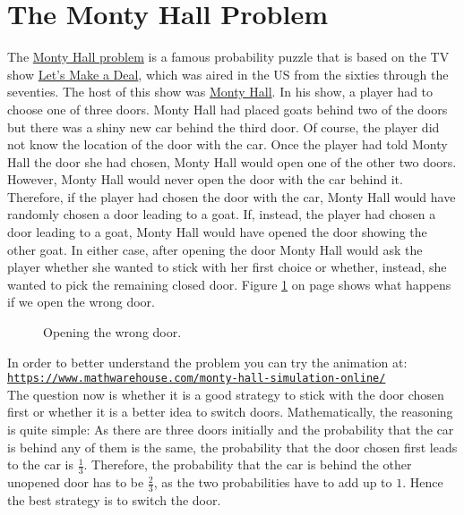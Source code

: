 \section{The Monty Hall Problem}
The \href{http://en.wikipedia.org/wiki/Monty_Hall_problem}{Monty Hall problem} is a famous probability
puzzle that is based on the TV show 
\href{http://en.wikipedia.org/wiki/Let%27s_Make_a_Deal}{Let's Make a Deal}, which was aired in the
US from the sixties through the seventies.  The host of this show was 
\href{http://en.wikipedia.org/wiki/Monty_Hall}{Monty Hall}. In his show, a player had to choose one
of three doors.  Monty Hall had placed goats behind two of the doors but there was a shiny new car
behind the third door.  Of course, the player did not know the location of the door with the car.  
Once the player had told Monty Hall the door she had chosen, Monty Hall would open one of the other
two doors.  However, Monty Hall would never open the door with the car behind it.  Therefore, if the
player had chosen the door with the car, Monty Hall would have randomly chosen a door leading to a
goat.  If, instead, the player had chosen a door leading to a goat, Monty Hall would have opened the
door showing the other goat.  In either case, after opening the door  Monty Hall would ask the
player whether she wanted to stick with her first choice or whether, instead, she wanted to pick the
remaining closed door.  Figure \ref{fig:monty-hall} on page \pageref{fig:monty-hall} shows what happens if we
open the wrong door.

\begin{figure}[!t]
  \centering
  \caption{Opening the wrong door.}
  \label{fig:monty-hall}
\end{figure}


In order to better understand the problem you can try the animation at:
\\[0.2cm]
\hspace*{1.3cm}
\href{https://www.mathwarehouse.com/monty-hall-simulation-online/}{\texttt{https://www.mathwarehouse.com/monty-hall-simulation-online/}}
\\[0.2cm]
The question now is whether it is a good strategy to stick with the door chosen first or whether it
is a better idea to switch doors.  Mathematically, the reasoning is quite simple: As there are three doors
initially and the probability that the car is behind any of them is the same, the probability that the
door chosen first leads to the car is $\frac{1}{3}$.  Therefore, the probability that the car is behind
the other unopened door has to be $\frac{2}{3}$, as the two probabilities have to add up to $1$.  Hence the
best strategy is to switch the door.

